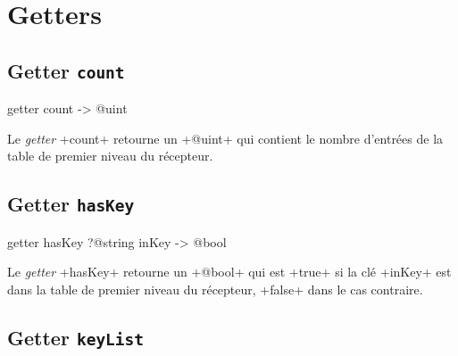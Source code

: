 \section{Getters}

%
%

\subsection{Getter \texttt{count}}

\begin{galgas}
getter count -> @uint
\end{galgas}


Le \emph{getter} \ggs+count+ retourne un \ggs+@uint+ qui contient le nombre d'entrées de la table de premier niveau du récepteur.



\subsection{Getter \texttt{hasKey}}

\begin{galgas}
getter hasKey ?@string inKey -> @bool
\end{galgas}


Le \emph{getter} \ggs+hasKey+ retourne un \ggs+@bool+ qui est \ggs+true+ si la clé \ggs+inKey+ est dans la table de premier niveau du récepteur, \ggs+false+ dans le cas contraire.



\subsection{Getter \texttt{keyList}}

